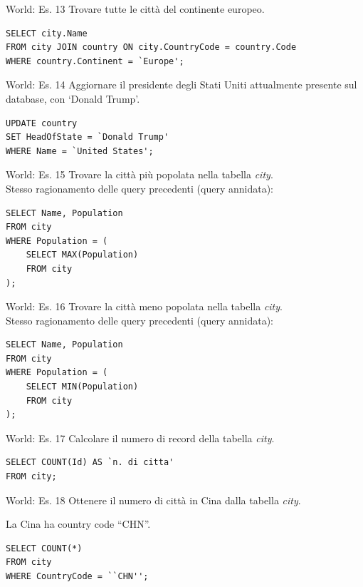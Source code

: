 %
\begin{frame}[fragile]{World: Es. 13}
Trovare tutte le citt\`a del continente europeo.
\pause
\begin{lstlisting}
SELECT city.Name
FROM city JOIN country ON city.CountryCode = country.Code
WHERE country.Continent = `Europe';
\end{lstlisting}
\end{frame}
%
\begin{frame}[fragile]{World: Es. 14}
Aggiornare il presidente degli Stati Uniti attualmente presente sul database, con `Donald Trump'.
\pause
\begin{lstlisting}
UPDATE country
SET HeadOfState = `Donald Trump'
WHERE Name = `United States';
\end{lstlisting}
\end{frame}
%
\begin{frame}[fragile]{World: Es. 15}
Trovare la citt\`a pi\`u popolata nella tabella \textit{city}.
\pause
\newline
\\Stesso ragionamento delle query precedenti (query annidata):
\begin{lstlisting}
SELECT Name, Population
FROM city
WHERE Population = (
    SELECT MAX(Population)
    FROM city
);
\end{lstlisting}
\end{frame}
%
\begin{frame}[fragile]{World: Es. 16}
Trovare la citt\`a meno popolata nella tabella \textit{city}.
\pause
\newline
\\Stesso ragionamento delle query precedenti (query annidata):
\begin{lstlisting}
SELECT Name, Population
FROM city
WHERE Population = (
    SELECT MIN(Population)
    FROM city
);
\end{lstlisting}
\end{frame}
%
\begin{frame}[fragile]{World: Es. 17}
Calcolare il numero di record della tabella \textit{city}.
\pause
\begin{lstlisting}
SELECT COUNT(Id) AS `n. di citta'
FROM city;
\end{lstlisting}
\end{frame}
%
\begin{frame}[fragile]{World: Es. 18}
Ottenere il numero di citt\`a in Cina dalla tabella \textit{city}.

La Cina ha country code ``CHN''.
\pause
\begin{lstlisting}
SELECT COUNT(*)
FROM city
WHERE CountryCode = ``CHN'';
\end{lstlisting}
\end{frame}
%